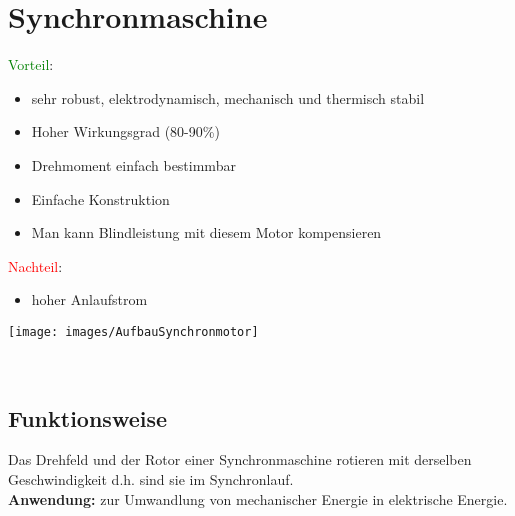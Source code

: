 \section{Synchronmaschine}
    \renewcommand{\arraystretch}{2.5} 
\begin{minipage}{0.5\linewidth}   
\textcolor{green}{Vorteil}:
\begin{itemize} 
	\item sehr robust, elektrodynamisch, mechanisch und thermisch stabil
    \item Hoher Wirkungsgrad (80-90\%)
	\item Drehmoment einfach bestimmbar
	\item Einfache Konstruktion
	\item Man kann Blindleistung mit diesem Motor kompensieren
\end{itemize}
\textcolor{red}{Nachteil}:
\begin{itemize} 
\item hoher Anlaufstrom
\end{itemize}
\end{minipage}
\begin{minipage}{0.33\linewidth}
    \texttt{[image: images/AufbauSynchronmotor]}
\end{minipage}
\\
\subsection{Funktionsweise}
Das Drehfeld und der Rotor einer Synchronmaschine rotieren mit derselben Geschwindigkeit d.h. sind sie im Synchronlauf. \\
\textbf{Anwendung:} zur Umwandlung von mechanischer Energie in elektrische Energie.

